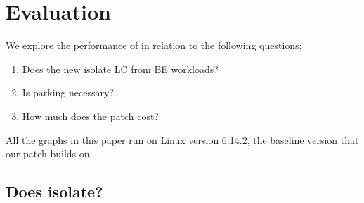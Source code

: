 \section{Evaluation}
\label{s:eval}

We explore the performance of \schedbe{} in relation to the following questions:
\begin{enumerate}
    \item Does the new \schedbe{} isolate LC from BE workloads?
    \item Is parking necessary?
    \item How much does the patch cost?
\end{enumerate}

All the graphs in this paper run on Linux version 6.14.2, the baseline version
that our patch builds on. 

\subsection{Does \schedbe{} isolate?}

